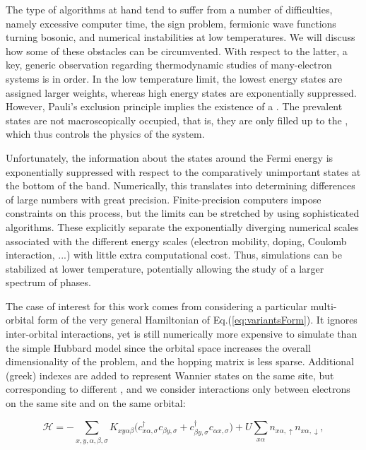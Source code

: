 The type of algorithms at hand tend to suffer from a number of difficulties, namely excessive computer time, the sign problem, fermionic wave functions turning bosonic, and numerical instabilities at low temperatures.
We will discuss how some of these obstacles can be circumvented.
With respect to the latter, a key, generic observation regarding thermodynamic studies of many-electron systems is in order.
In the low temperature limit, the lowest energy states are assigned larger weights, whereas high energy states are exponentially suppressed.
However, Pauli's exclusion principle implies the existence of a .
The prevalent states are not macroscopically occupied, that is, they are only filled up to the , which thus controls the physics of the system.

Unfortunately, the information about the states around the Fermi energy is exponentially suppressed with respect to the comparatively unimportant states at the bottom of the band.
Numerically, this translates into determining differences of large numbers with great precision.
Finite-precision computers impose constraints on this process, but the limits can be stretched by using sophisticated algorithms.
These explicitly separate the exponentially diverging numerical scales associated with the different energy scales (electron mobility, doping, Coulomb interaction, ...) with little extra computational cost.
Thus, simulations can be stabilized at lower temperature, potentially allowing the study of a larger spectrum of phases.

The case of interest for this work comes from considering a particular multi-orbital form of the very general Hamiltonian of Eq.(\ref{eq:variantsForm}).
It ignores inter-orbital interactions, yet is still numerically more expensive to simulate than the simple Hubbard model since the orbital space increases the overall dimensionality of the problem, and the hopping matrix is less sparse.
Additional (greek) indexes are added to represent Wannier states on the same site, but corresponding to different , and we consider interactions only between electrons on the same site and on the same orbital:

\begin{equation}\label{eq:variantTMD}
\mathcal{H} = - \sum_{x, y, \alpha, \beta,  \sigma} K_{xy\alpha\beta} \bigg( c_{x\alpha, \sigma}^\dagger c_{\beta y, \sigma} + c_{\beta y, \sigma}^\dagger c_{\alpha x, \sigma} \bigg) + U \sum_{x \alpha} n_{x\alpha, \uparrow} n_{x\alpha, \downarrow} ,
\end{equation}

